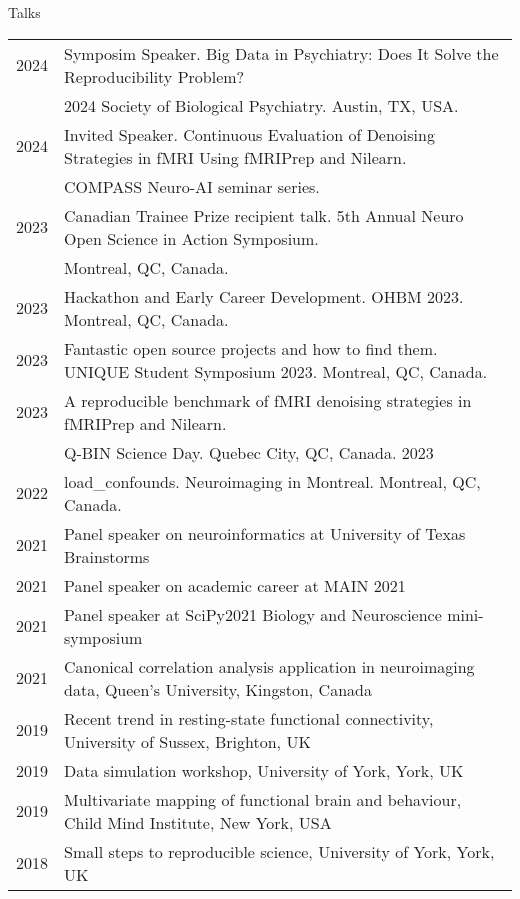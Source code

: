 \documentclass{resume} %
\begin{document}
\begin{rSection}{Talks}
  \begin{tabular}{@{} l l @{\hspace{10ex}}}
    2024 & Symposim Speaker. Big Data in Psychiatry: Does It Solve the Reproducibility Problem? \\ & 2024 Society of Biological Psychiatry. Austin, TX, USA.\\
    2024 & Invited Speaker. Continuous Evaluation of Denoising Strategies in fMRI Using fMRIPrep and Nilearn. \\ & COMPASS Neuro-AI seminar series.\\
    2023 & Canadian Trainee Prize recipient talk. 5th Annual Neuro Open Science in Action Symposium. \\ & Montreal, QC, Canada.\\
    2023 & Hackathon and Early Career Development. OHBM 2023. Montreal, QC, Canada.\\
    2023 & Fantastic open source projects and how to find them. UNIQUE Student Symposium 2023. Montreal, QC, Canada.\\
    2023 & A reproducible benchmark of fMRI denoising strategies in fMRIPrep and Nilearn. \\ & Q-BIN Science Day. Quebec City, QC, Canada. 2023\\
   	2022 & load\_confounds. Neuroimaging in Montreal. Montreal, QC, Canada.\\
    2021 & Panel speaker on neuroinformatics at University of Texas Brainstorms\\
    2021 & Panel speaker on academic career at MAIN 2021\\
    2021 & Panel speaker at SciPy2021 Biology and Neuroscience mini-symposium\\
  	2021 & Canonical correlation analysis application in neuroimaging data, Queen's University, Kingston, Canada\\
    2019 & Recent trend in resting-state functional connectivity, University of Sussex, Brighton, UK\\
    2019 & Data simulation workshop, University of York, York, UK\\
    2019 & Multivariate mapping of functional brain and behaviour, Child Mind Institute, New York, USA\\
    2018 & Small steps to reproducible science, University of York, York, UK\\
  \end{tabular}
\end{rSection}
\end{document}
